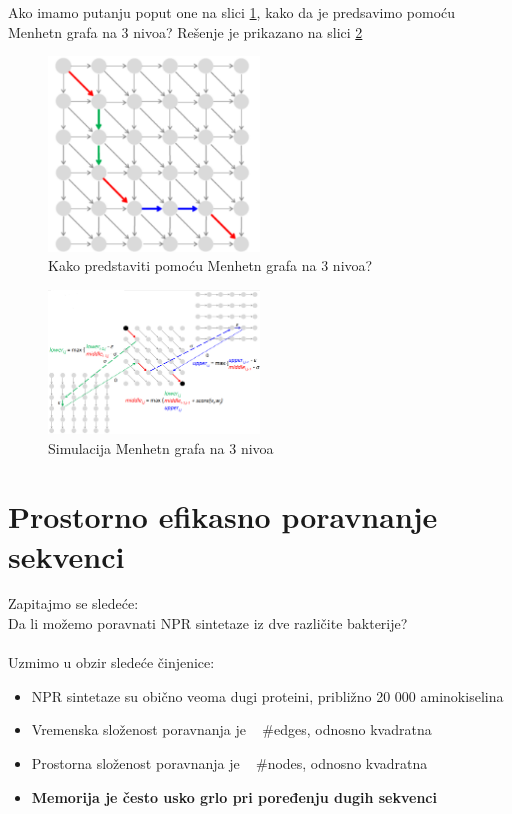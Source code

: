 Ako imamo putanju poput one na slici \ref{slika:kakoSimulirati}, kako da je predsavimo pomoću Menhetn grafa na 3 nivoa? Rešenje je prikazano na slici \ref{slika:simulacija}


\begin{figure}[]
\centering
\includegraphics[width=0.5\textwidth]{poglavlja/5/slike/kakoSimulirari.png}
\caption{Kako predstaviti pomoću Menhetn grafa na 3 nivoa?}
\label{slika:kakoSimulirati}
\end{figure}


\begin{figure}[h]
\centering
\includegraphics[width=0.5\textwidth]{poglavlja/5/slike/simulacija.png}
\caption{Simulacija Menhetn grafa na 3 nivoa}
\label{slika:simulacija}
\end{figure}


\section{Prostorno efikasno poravnanje sekvenci}

Zapitajmo se sledeće: \\
Da li možemo poravnati NPR sintetaze iz dve različite bakterije? \\
\\

Uzmimo u obzir sledeće činjenice:
\begin{itemize}
    \item NPR sintetaze su obično veoma dugi proteini, približno 20 000 aminokiselina
    \item Vremenska složenost poravnanja je ~ #edges, odnosno kvadratna
    \item Prostorna složenost poravnanja je ~ #nodes, odnosno kvadratna
    \item \textbf{Memorija je često usko grlo pri poređenju dugih sekvenci}
\end{itemize}

